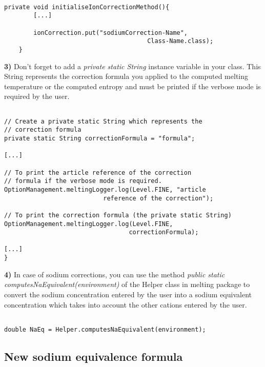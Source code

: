 \documentclass{article}
\begin{document}
\begin{verbatim}

private void initialiseIonCorrectionMethod(){
		[...]
		
		ionCorrection.put("sodiumCorrection-Name", 
		                               Class-Name.class);
	}

\end{verbatim} 


\textbf{3)} Don't forget to add a \textit{private static String} instance variable in your class. This
String represents the correction formula you applied to the computed melting temperature or the
computed entropy and must be printed if the verbose mode is required by the user.

\begin{verbatim}

// Create a private static String which represents the 
// correction formula
private static String correctionFormula = "formula";

[...]

// To print the article reference of the correction 
// formula if the verbose mode is required.
OptionManagement.meltingLogger.log(Level.FINE, "article 
                           reference of the correction");

// To print the correction formula (the private static String)
OptionManagement.meltingLogger.log(Level.FINE, 
                                  correctionFormula);

[...]
}

\end{verbatim}


\textbf{4)} In case of sodium corrections, you can use the method \textit{public static computesNaEquivalent(environment)} 
of the Helper class in melting package to convert the sodium concentration entered by the user
into a sodium equivalent concentration which takes into account the other cations entered 
by the user.

\begin{verbatim}

double NaEq = Helper.computesNaEquivalent(environment);

\end{verbatim}

\subsection{New sodium equivalence formula}
\end{document}
